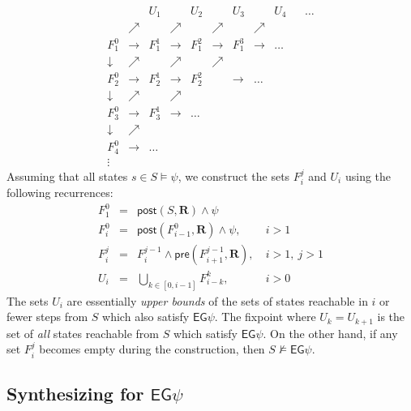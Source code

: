 \documentclass[10pt]{article}
\newcommand{\ctrans}{\ensuremath{\mathbf{R}}\xspace}
\newcommand{\eg}[1]{\ensuremath{\mathsf{EG}#1\xspace}}
\newcommand{\post}[2]{\ensuremath{\mathsf{post}(#1, #2)}\xspace}
\newcommand{\pre}[2]{\ensuremath{\mathsf{pre}(#1, #2)}\xspace}
\begin{document}
\begin{spacing}{1}
\begin{eqnarray*}[lclclclclcl]
& & U_1 & & U_2 & & U_3 & & U_4 & & \ldots \\
& \nearrow & & \nearrow & & \nearrow & &\nearrow \\
F_1^0 & \rightarrow & F_1^1 & \rightarrow & F_1^2 & \rightarrow & F_1^3 &
\rightarrow & \ldots\\
\downarrow & \nearrow & & \nearrow & &\nearrow&\\
F_2^0 & \rightarrow & F_2^1 & \rightarrow & F_2^2 & & \rightarrow & \ldots &\\
\downarrow & \nearrow & & \nearrow & & &\\
F_3^0 & \rightarrow & F_3^1 & \rightarrow & \ldots & & & &\\
\downarrow & \nearrow & & & & &\\
F_4^0 & \rightarrow & \ldots & & & & &\\
\vdots
\end{eqnarray*}
Assuming that all states $s \in S \models \psi$, we construct the sets
$F_i^j$ and $U_i$ using the following recurrences:
\begin{eqnarray*}[lcll]
F_1^0 & = & \post{S}{\ctrans} \wedge \psi &\\
F_i^0 & = & \post{F_{i-1}^0}{\ctrans} \wedge \psi, & \ i > 1\\
F_i^j & = & F_i^{j-1} \wedge \pre{F_{i+1}^{j-1}}{\ctrans}, & \ i > 1,\ j >
1\\
U_i & = & \bigcup_{k \in [0,i-1]} F_{i-k}^{k}, &\ i > 0
\end{eqnarray*}
The sets $U_i$ are essentially \emph{upper bounds} of the sets of states
reachable in $i$ or fewer steps from $S$ which also satisfy
$\eg{\psi}$. The fixpoint where $U_k = U_{k+1}$ is the set of \emph{all}
states reachable from $S$ which satisfy \eg{\psi}. On the other hand, if
any set $F_i^j$ becomes empty during the construction, then $S \not\models
\eg{\psi}$.

\subsection{Synthesizing for $\eg{\psi}$}

\end{spacing}
\end{document}
